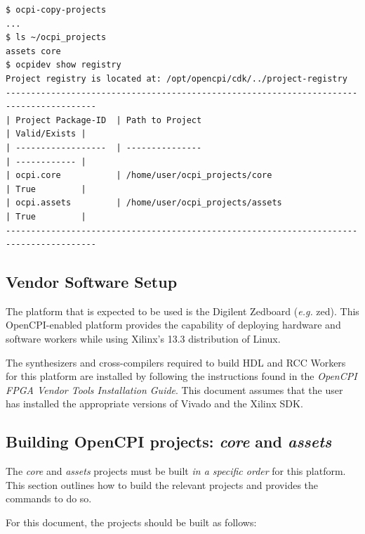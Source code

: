 \begin{flushleft}
\begin{verbatim}
$ ocpi-copy-projects
...
$ ls ~/ocpi_projects
assets core
$ ocpidev show registry
Project registry is located at: /opt/opencpi/cdk/../project-registry
----------------------------------------------------------------------------------------
| Project Package-ID  | Path to Project                                 | Valid/Exists |
| ------------------  | ---------------                                 | ------------ |
| ocpi.core           | /home/user/ocpi_projects/core                   | True         |
| ocpi.assets         | /home/user/ocpi_projects/assets                 | True         |
----------------------------------------------------------------------------------------
\end{verbatim}

\subsection{Vendor Software Setup}
The platform that is expected to be used is the Digilent Zedboard (\textit{e.g.} zed). This OpenCPI-enabled platform provides the capability of deploying hardware and software workers while using Xilinx's 13.3 distribution of Linux.\\ \bigskip

The synthesizers and cross-compilers required to build HDL and RCC Workers for this platform are installed by following the instructions found in the \textit{OpenCPI FPGA Vendor Tools Installation Guide}. This document assumes that the user has installed the appropriate versions of Vivado and the Xilinx SDK.\\ \bigskip

\subsection{Building OpenCPI projects: \textit{core} and \textit{assets} }
\label{sec:Building OpenCPI projects}
The \textit{core} and \textit{assets} projects must be built \textit{in a specific order} for this platform. This section outlines how to build the relevant projects and provides the commands to do so.\medskip

For this document, the projects should be built as follows:\\


\end{flushleft}
